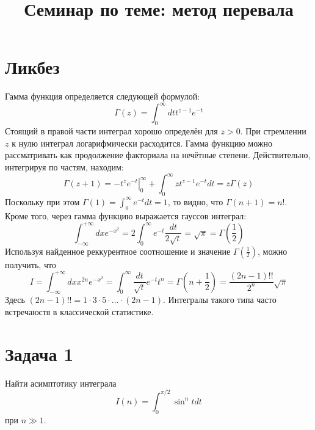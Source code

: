 \documentclass[a4paper,12pt]{article}
\begin{document}
\title{Семинар по теме: метод перевала}
\maketitle

\section{Ликбез}
Гамма функция определяется следующей формулой:
$$
\Gamma(z)=\int_0^{\infty}dt t^{z-1} e^{-t}
$$
Стоящий в правой части интеграл хорошо определён для $z>0$. При стремлении $z$ к нулю интеграл логарифмически расходится. Гамма функцию можно рассматривать как продолжение факториала на нечётные степени. Действительно, интегрируя по частям, находим:
$$
\Gamma(z+1)=-\left.t^z e^{-t}\right|_{0}^{\infty} + \int_0^{\infty}zt^{z-1}e^{-t}dt=z\Gamma(z)
$$
Поскольку при этом $\Gamma(1)=\int_{0}^{\infty}e^{-t}dt=1$, то видно, что $\Gamma(n+1)=n!$. Кроме того, через гамма функцию выражается гауссов интеграл:
$$
\int_{-\infty}^{+\infty}dx e^{-x^2}=2\int_{0}^{\infty}e^{-t}\frac{dt}{2\sqrt{t}}=\sqrt{\pi}=\Gamma\left(\frac{1}{2}\right)
$$
Используя найденное реккурентное соотношение и значение $\Gamma\left(\frac{1}{2}\right)$, можно получить, что 
$$
I=\int_{-\infty}^{+\infty}dx x^{2n}e^{-x^2}=\int_{0}^{\infty}\frac{dt}{\sqrt{t}} e^{-t} t^{n}=\Gamma\left(n+\frac{1}{2}\right)=\frac{(2n-1)!!}{2^{n}}\sqrt{\pi}
$$
Здесь $(2n-1)!!=1\cdot 3\cdot 5\cdot...\cdot(2n-1)$. Интегралы такого типа часто встречаюстя в классической статистике.
\section{Задача 1}

Найти асимптотику интеграла 
\[
I(n)=\int_{0}^{\pi/2}\sin^n t dt
\]
при $n\gg 1$.
\end{document}
